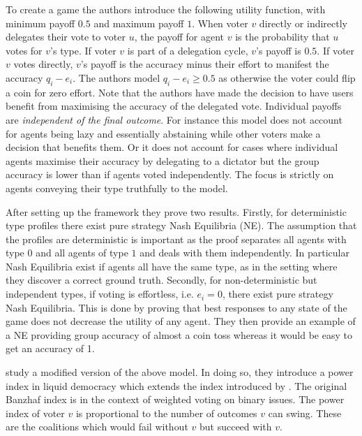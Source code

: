 \documentclass[11pt,a4paper, titlepage]{article}
\theoremstyle{definition}
\begin{document}
To create a game the authors introduce the following utility function, with minimum payoff $0.5$ and maximum payoff $1$.
When voter $v$ directly or indirectly delegates their vote to voter $u$, the payoff for agent $v$ is the probability that $u$ votes for $v$'s type.
If voter $v$ is part of a delegation cycle, $v$'s payoff is $0.5$.
If voter $v$ votes directly, $v$'s payoff is the accuracy minus their effort to manifest the accuracy $q_i - e_i$.
The authors model $q_i - e_i \geq 0.5$ as otherwise the voter could flip a coin for zero effort.
Note that the authors have made the decision to have users benefit from maximising the accuracy of the delegated vote.
Individual payoffs are \emph{independent of the final outcome}.
For instance this model does not account for agents being lazy and essentially abstaining while other voters make a decision that benefits them.
Or it does not account for cases where individual agents maximise their accuracy by delegating to a dictator but the group accuracy is lower than if agents voted independently.
The focus is strictly on agents conveying their type truthfully to the model.

After setting up the framework they prove two results. 
Firstly, for deterministic type profiles there exist pure strategy Nash Equilibria (NE).
The assumption that the profiles are deterministic is important as the proof separates all agents with type $0$ and all agents of type $1$ and deals with them independently.
In particular Nash Equilibria exist if agents all have the same type, as in the setting where they discover a correct ground truth.
Secondly, for non-deterministic but independent types, if voting is effortless, i.e. $e_i = 0$, there exist pure strategy Nash Equilibria.
This is done by proving that best responses to any state of the game does not decrease the utility of any agent.
They then provide an example of a NE providing group accuracy of almost a coin toss whereas it would be easy to get an accuracy of 1. 

\citet{zhang2021power} study a modified version of the above model. In doing so, they introduce a power index in liquid democracy which extends the index introduced by \citet{banzhaf1964weighted}.
The original Banzhaf index is in the context of weighted voting on binary issues.
The power index of voter $v$ is proportional to the number of outcomes $v$ can swing.
These are the coalitions which would fail without $v$ but succeed with $v$.
\end{document}
